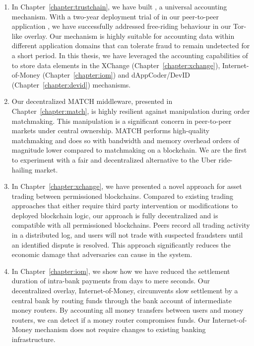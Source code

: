 \begin{enumerate}
	\item In Chapter~\ref{chapter:trustchain}, we have built \TrustChain{}, a universal accounting mechanism.
	With a two-year deployment trial of \TrustChain{} in our peer-to-peer application \Tribler{}, we have successfully addressed free-riding behaviour in our Tor-like overlay.
	Our \TrustChain{} mechanism is highly suitable for accounting data within different application domains that can tolerate fraud to remain undetected for a short period.
	In this thesis, we have leveraged the accounting capabilities of \TrustChain{} to store data elements in the XChange (Chapter~\ref{chapter:xchange}), Internet-of-Money (Chapter~\ref{chapter:iom}) and dAppCoder/DevID (Chapter~\ref{chapter:devid}) mechanisms.
	
	\item Our decentralized MATCH middleware, presented in Chapter~\ref{chapter:match}, is highly resilient against manipulation during order matchmaking.
	This manipulation is a significant concern in peer-to-peer markets under central ownership.
	MATCH performs high-quality matchmaking and does so with bandwidth and memory overhead orders of magnitude lower compared to matchmaking on a blockchain.
	We are the first to experiment with a fair and decentralized alternative to the Uber ride-hailing market.
	
	\item In Chapter~\ref{chapter:xchange}, we have presented a novel approach for asset trading between permissioned blockchains.
	Compared to existing trading approaches that either require third party intervention or modifications to deployed blockchain logic, our approach is fully decentralized and is compatible with all permissioned blockchains.
	Peers record all trading activity in a distributed log, and users will not trade with suspected fraudsters until an identified dispute is resolved.
	This approach significantly reduces the economic damage that adversaries can cause in the system.
	
	\item In Chapter~\ref{chapter:iom}, we show how we have reduced the settlement duration of intra-bank payments from days to mere seconds.
	Our decentralized overlay, Internet-of-Money, circumvents slow settlement by a central bank by routing funds through the bank account of intermediate money routers.
	By accounting all money transfers between users and money routers, we can detect if a money router compromises funds.
	Our Internet-of-Money mechanism does not require changes to existing banking infrastructure.
	

\end{enumerate}
